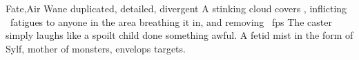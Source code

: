  {Fate,Air}%
  {Wane}%
  {duplicated, detailed, divergent}%
  {}%
  {A stinking cloud covers , inflicting ~\glspl{fatigue} to anyone in the area breathing it in, and removing ~\glspl{fp}}%
  {
    The caster simply laughs like a spoilt child done something awful.
    A fetid mist in the form of Sylf, mother of monsters, envelops  targets.
  }

